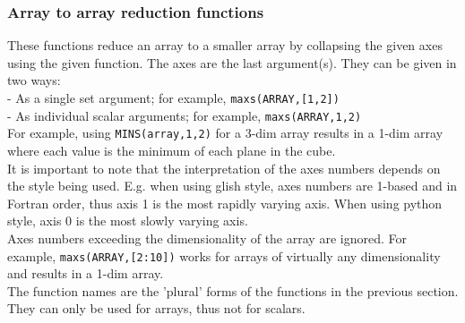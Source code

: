 \subsubsection{Array to array reduction functions}
These functions reduce an array to a smaller array by collapsing
the given axes using the given function. The axes are the last argument(s).
They can be given in two ways:
\\- As a single set argument; for example, \texttt{maxs(ARRAY,[1,2])}
\\- As individual scalar arguments; for example, \texttt{maxs(ARRAY,1,2)}
\\For example, using
\texttt{MINS(array,1,2)} for a 3-dim array results in a 1-dim array
where each value is the minimum of each plane in the cube.
\\It is important to note that the interpretation of the axes numbers
depends on the style being used. E.g. when using glish style, axes numbers are
1-based and in Fortran order, thus axis 1 is the most rapidly varying
axis. When using python style, axis 0 is the most slowly varying axis.
\\Axes numbers exceeding the dimensionality of the array are ignored.
For example, \texttt{maxs(ARRAY,[2:10])} works for arrays
of virtually any dimensionality and results in a 1-dim array.
\\The function names are the 'plural' forms of the
functions in the previous section.
They can only be used for arrays, thus not for scalars.

